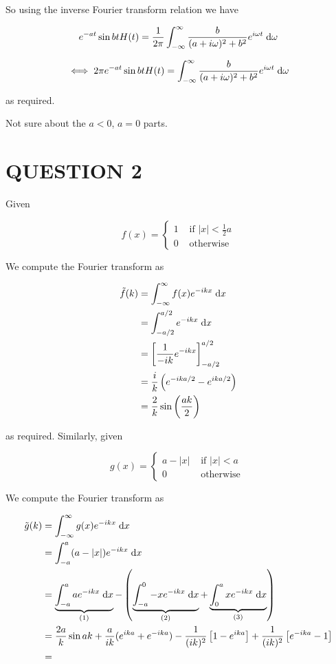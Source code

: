 \documentclass[a4paper]{article}
\begin{document}
So using the inverse Fourier transform relation we have

\[ e^{-at} \sin bt H(t) = \frac{1}{2 \pi} \int_{-\infty}^{\infty} \frac{b}{(a + i \omega)^{2} + b^{2} } e^{i \omega t} \; \mathrm{d} \omega \]

\[ \iff 2 \pi  e^{-at} \sin bt H(t) = \int_{-\infty}^{\infty} \frac{b}{(a + i \omega)^{2} + b^{2} } e^{i \omega t} \; \mathrm{d} \omega  \]

as required.

Not sure about the $ a < 0 $, $ a = 0 $ parts. 







\section{QUESTION 2}

Given

\[ f(x) = \begin{cases}  1  & \text{ if } | x | < \frac{1}{2} a \\ 0 & \text{ otherwise } \end{cases} \]

We compute the Fourier transform as 

\begin{align*}
\tilde{f}(k) & = \int_{-\infty}^{\infty} f(x) e^{- i k x} \; \mathrm{d} x \\
& = \int_{-a/2}^{a/2} e^{-ikx} \; \mathrm{d} x \\
& = \left[ \frac{1}{-ik} e^{-ikx}  \right]_{-a/2}^{a/2} \\
& = \frac{i}{k} \left(  e^{-ika/2} - e^{ika/2} \right) \\
& =  \frac{2}{k} \sin \left( \frac{ak}{2} \right) 
\end{align*}

as required. Similarly, given

\[ g(x) = \begin{cases} a - | x |  & \text{ if } | x | < a \\ 0 & \text{ otherwise } \end{cases} \]

We compute the Fourier transform as 

\begin{align*}
\tilde{g}(k) & = \int_{-\infty}^{\infty} g(x) e^{- i k x} \; \mathrm{d} x \\
& = \int_{-a}^{a} ( a - | x | )e^{-ikx} \; \mathrm{d} x \\
& =  \underbrace{\int_{-a}^{a} a e^{-ikx} \; \mathrm{d} x}_{(1)} - \left(  \underbrace{\int_{-a}^{0} - x e^{-ikx} \; \mathrm{d} x}_{(2)}   + \underbrace{\int_{0}^{a} x e^{-ikx} \; \mathrm{d} x }_{(3)} \right) \\
& =  \frac{2a}{k} \sin a k + \frac{a}{ik} (  e^{ika} + e^{-ika} ) - \frac{1}{(ik)^{2}}\left[ 1 - e^{ika} \right] + \frac{1}{(ik)^{2}} \left[  e^{-ika} - 1 \right] \\
& =   
\end{align*}
\end{document}

